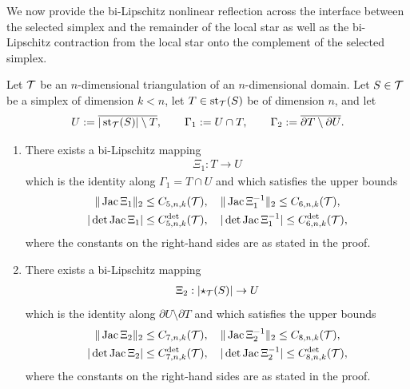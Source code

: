 \documentclass[10pt,a4paper]{article}
\begin{document}
We now provide the bi-Lipschitz nonlinear reflection across the interface between the selected simplex and the remainder of the local star
as well as the bi-Lipschitz contraction from the local star onto the complement of the selected simplex. 

\begin{proposition}\label{proposition:starreflection}
    Let ${\mathcal T}$ be an $n$-dimensional triangulation of an $n$-dimensional domain. 
    Let $S \in {\mathcal T}$ be a simplex of dimension $k < n$,
    let $T \in \operatorname{st}_{{\mathcal T}}(S)$ be of dimension $n$,
    and let 
    \begin{align*}
        U := \overline{ |\operatorname{st}_{{\mathcal T}}(S)| \setminus T },
        \qquad 
        {\Gamma_1} := U \cap T,
        \qquad 
        {\Gamma_2} := \overline{ \partial T \setminus \partial U }.
    \end{align*}
    \begin{enumerate}
    \item 
    There exists a bi-Lipschitz mapping
    \begin{align*}
        \Xi_{1} : T \rightarrow U
    \end{align*}
    which is the identity along ${\Gamma_1} = T \cap U$ and which satisfies the upper bounds 
    \begin{gather*}
        \|  \operatorname{{\rm Jac}}\Xi_{1}  \|_{2}          \leq C_{5,n,k}({\mathcal T}),
        \quad 
        \|  \operatorname{{\rm Jac}}\Xi_{1}^{-1}  \|_{2}     \leq C_{6,n,k}({\mathcal T}),
        \\
        | \det\operatorname{{\rm Jac}}\Xi_{1} |      \leq C^{\det}_{5,n,k}({\mathcal T}),
        \quad 
        | \det\operatorname{{\rm Jac}}\Xi_{1}^{-1} | \leq C^{\det}_{6,n,k}({\mathcal T}),
    \end{gather*}
    where the constants on the right-hand sides are as stated in the proof. 
    \item 
    There exists a bi-Lipschitz mapping
    \begin{align*}
        \Xi_{2} : \left| \star_{{\mathcal T}}(S) \right| \rightarrow U
    \end{align*}
    which is the identity along $\partial U \setminus \partial T$ and which satisfies the upper bounds 
    \begin{gather*}
        \|  \operatorname{{\rm Jac}}\Xi_{2}  \|_{2}          \leq C_{7,n,k}({\mathcal T}),
        \quad 
        \|  \operatorname{{\rm Jac}}\Xi_{2}^{-1}  \|_{2}     \leq C_{8,n,k}({\mathcal T}),
        \\
        | \det\operatorname{{\rm Jac}}\Xi_{2} |      \leq C^{\det}_{7,n,k}({\mathcal T}),
        \quad 
        | \det\operatorname{{\rm Jac}}\Xi_{2}^{-1} | \leq C^{\det}_{8,n,k}({\mathcal T}),
    \end{gather*}
    where the constants on the right-hand sides are as stated in the proof. 
    \end{enumerate}
\end{proposition}
\end{document}
